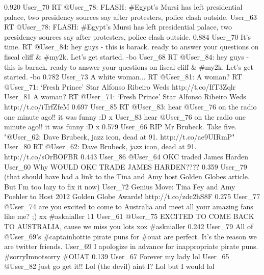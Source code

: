 {0.920}
{\joinNameTweet
{User\_70}
{RT @User\_78: FLASH: \#Egypt's Mursi has left presidential palace, two presidency sources say after protesters, police clash outside.}}
{\joinNameTweet
{User\_63}
{RT @User\_78: FLASH: \#Egypt's Mursi has left presidential palace, two presidency sources say after protesters, police clash outside.}}
{0.884}
{\joinNameTweet
{User\_70}
{It's time. RT @User\_84: hey guys - this is barack.  ready to answer your questions on fiscal cliff \& \#my2k.  Let's get started. -bo}}
{\joinNameTweet
{User\_68}
{RT @User\_84: hey guys - this is barack.  ready to answer your questions on fiscal cliff \& \#my2k.  Let's get started. -bo}}
{0.782}
{\joinNameTweet
{User\_73}
{A white woman... RT @User\_81: A woman? RT @User\_71: ‘Fresh Prince' Star Alfonso Ribeiro Weds http://t.co/IfT3Zqlr}}
{\joinNameTweet
{User\_81}
{A woman? RT @User\_71: ‘Fresh Prince' Star Alfonso Ribeiro Weds http://t.co/iTrfZfeM}}
{0.697}
{\joinNameTweet
{User\_85}
{RT @User\_83: hear @User\_76 on the radio one minute ago!! it was funny :D x}}
{\joinNameTweet
{User\_83}
{hear @User\_76 on the radio one minute ago!! it was funny :D x}}
{0.579}
{\joinNameTweet
{User\_66}
{RIP Mr Brubeck. Take five. "@User\_62: Dave Brubeck, jazz icon, dead at 91. http://t.co/ae9UIRmP"}}
{\joinNameTweet
{User\_80}
{RT @User\_62: Dave Brubeck, jazz icon, dead at 91. http://t.co/sOrBOFBR}}
{0.443}
{\joinNameTweet
{User\_86}
{@User\_64 OKC traded James Harden}}
{\joinNameTweet
{User\_60}
{Why WOULD OKC TRADE JAMES HARDEN????}}
{0.359}
{\joinNameTweet
{User\_79}
{(that should have had a link to the Tina and Amy host Golden Globes article. But I'm too lazy to fix it now)}}
{\joinNameTweet
{User\_72}
{Genius Move: Tina Fey and Amy Poehler to Host 2012 Golden Globe Awards! http://t.co/zdc2hS8F}}
{0.275}
{\joinNameTweet
{User\_77}
{@User\_74 are you excited to come to Australia and meet all your amazing fans like me? ;) xx \#asknialler 11}}
{\joinNameTweet
{User\_61}
{@User\_75 EXCITED TO COME BACK TO AUSTRALIA, cause we miss you lots xox \#asknialler}}
{0.242}
{\joinNameTweet
{User\_79}
{All of @User\_69's \#captainhottie pirate puns for \#ouat are perfect. It's the reason we are twitter friends.}}
{\joinNameTweet
{User\_69}
{I apologize in advance for inappropriate pirate puns. \#sorryImnotsorry \#OUAT}}
{0.139}
{\joinNameTweet
{User\_67}
{Forever my lady lol}}
{\joinNameTweet
{User\_65}
{@User\_82 just go get it!! Lol (the devil) aint I? Lol but I would lol}}
